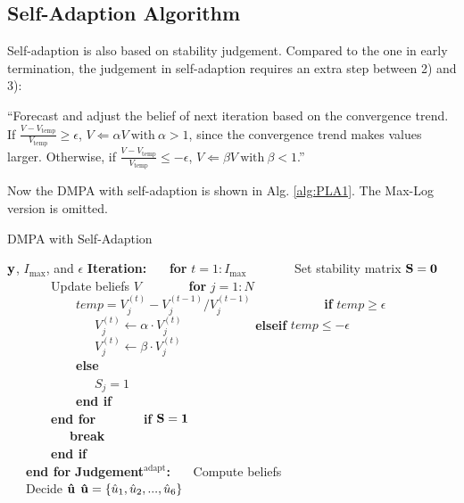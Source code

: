 \documentclass[journal,twoside]{IEEEtran}
\begin{document}
\subsection{Self-Adaption Algorithm}
Self-adaption \cite{Wu2010Adaptive,Savin2008Self} is also based on stability judgement. Compared to the one in early termination, the judgement in self-adaption requires an extra step between 2) and 3):

``Forecast and adjust the belief of next iteration based on the convergence trend. If $\frac{V-V_\text{temp}}{V_\text{temp}} \geq \epsilon$, $V \Leftarrow \alpha V~\text{with}~\alpha > 1$, since the convergence trend makes values larger. Otherwise, if $\frac{V-V_\text{temp}}{V_\text{temp}} \leq -\epsilon$, $V \Leftarrow \beta V ~\text{with}~\beta < 1$.''

Now the DMPA with self-adaption is shown in Alg. \ref{alg:PLA1}. The Max-Log version is omitted.
\begin{algorithm}[htbp]
\caption{DMPA with Self-Adaption}
\label{alg:PLA1}
\begin{algorithmic}[1]
\Require
$\bf{y}$,
$I_{\mathrm{max}}$,
and $\epsilon$
\State
\textbf{Iteration:}
\State
\ \ \ \textbf{for} $t=1:I_{\mathrm{max}}$
\State
\ \ \ \ \ \ \ Set stability matrix $\bf{S} = \bf{0}$
\State
\ \ \ \ \ \ \ Update beliefs $V$
\State
\ \ \ \ \ \ \ \textbf{for} $j=1:N$\\
\ \ \ \ \ \ \ \ \ \ \ $temp = V_{j}^{(t)}-V_{j}^{(t-1)} / V_{j}^{(t-1)}$
\State
\ \ \ \ \ \ \ \ \ \ \ \textbf{if} $temp \geq \epsilon$\\
\ \ \ \ \ \ \ \ \ \ \ \ \ \ $V_{j}^{(t)} \leftarrow \alpha \cdot V_{j}^{(t)}$
\State
\ \ \ \ \ \ \ \ \ \ \ \textbf{elseif} $temp \leq -\epsilon$\\
\ \ \ \ \ \ \ \ \ \ \ \ \ \ $V_{j}^{(t)} \leftarrow \beta \cdot V_{j}^{(t)}$\\
\ \ \ \ \ \ \ \ \ \ \ \textbf{else} \\
\ \ \ \ \ \ \ \ \ \ \ \ \ \ $S_{j} = 1$\\
\ \ \ \ \ \ \ \ \ \ \ \textbf{end if}\\
\ \ \ \ \ \ \ \textbf{end for}
\State
\ \ \ \ \ \ \ \textbf{if} $\bf{S} = \bf{1}$\\
\ \ \ \ \ \ \ \ \ \ \textbf{break}\\
\ \ \ \ \ \ \ \textbf{end if}\\
\ \ \ \textbf{end for}
\State
\textbf{Judgement$^{\text{adapt}}$:}
\State
\ \ \ Compute beliefs \\
\ \ \ Decide $\bf{\hat{u}}$
\Ensure
${\bf{\hat{u}}} = \{\hat{u}_{1}, \hat{u}_{2}, ..., \hat{u}_{6}\}$
\end{algorithmic}
\end{algorithm}
\end{document}
